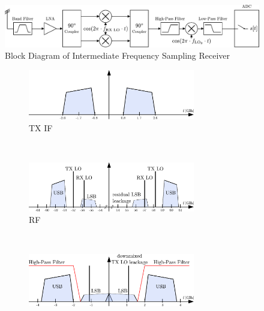 \begin{figure}[p]
  \centering
  \includegraphics[width=\textwidth]{figures/rx_1_bd}
  \caption{Block Diagram of Intermediate Frequency Sampling Receiver}
  \label{fig:rx_1_bd}
\end{figure}

\begin{figure}[p]
  \centering
  \begin{subfigure}{\textwidth}
    \centering
    \includegraphics[width=0.8\textwidth]{figures/rx_1_freq_tx_if}
    \caption{\gls{TX} \gls{IF}}
    \label{fig:rx_1_frq_tx_if}
  \end{subfigure}
  \vspace{4ex} \\
  \begin{subfigure}{\textwidth}
    \centering
    \includegraphics[width=0.8\textwidth]{figures/rx_1_freq_rf}
    \caption{\gls{RF}}
    \label{fig:rx_1_freq_rf}
  \end{subfigure}
  \vspace{4ex} \\
  \begin{subfigure}{\textwidth}
    \centering
    \includegraphics[width=0.8\textwidth]{figures/rx_1_freq_rx_if1}

\end{subfigure}
\end{figure}

